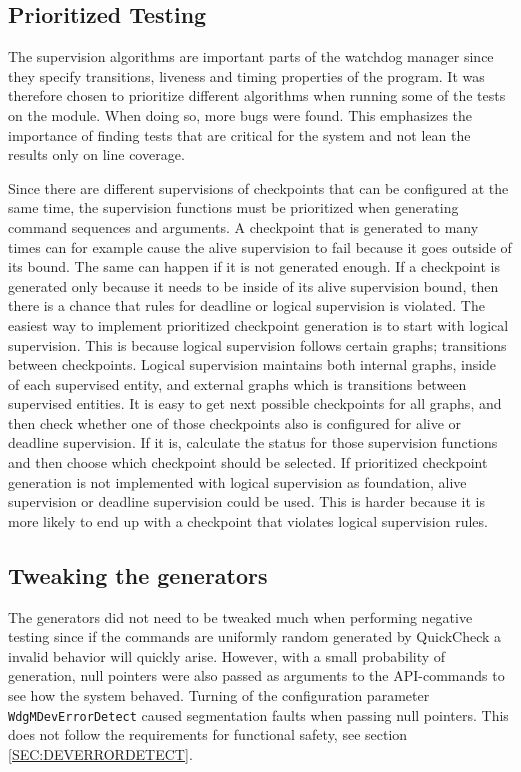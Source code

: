 \subsection{Prioritized Testing}
The supervision algorithms are important parts of the watchdog manager
since they specify transitions, liveness and timing properties of the
program. It was therefore chosen to prioritize different algorithms
when running some of the tests on the module. When doing so, more bugs
were found. This emphasizes the importance of finding tests that are
critical for the system and not lean the results only on line
coverage.

Since there are different supervisions of checkpoints that can be
configured at the same time, the supervision functions must be
prioritized when generating command sequences and arguments. A
checkpoint that is generated to many times can for example cause the
alive supervision to fail because it goes outside of its bound. The
same can happen if it is not generated enough. If a checkpoint is
generated only because it needs to be inside of its alive supervision
bound, then there is a chance that rules for deadline or logical
supervision is violated. The easiest way to implement prioritized
checkpoint generation is to start with logical supervision. This is
because logical supervision follows certain graphs; transitions
between checkpoints. Logical supervision maintains both internal
graphs, inside of each supervised entity, and external graphs which is
transitions between supervised entities. It is easy to get next
possible checkpoints for all graphs, and then check whether one of
those checkpoints also is configured for alive or deadline
supervision. If it is, calculate the status for those supervision
functions and then choose which checkpoint should be selected.
If prioritized checkpoint generation is not implemented with logical
supervision as foundation, alive supervision or deadline supervision
could be used. This is harder because it is more likely to end up with
a checkpoint that violates logical supervision rules.

\subsection{Tweaking the generators}
The generators did not need to be tweaked much when performing
negative testing since if the commands are uniformly random generated
by QuickCheck a invalid behavior will quickly arise. However, with a
small probability of generation, null pointers were also passed as
arguments to the API-commands to see how the system behaved. Turning
of the configuration parameter \lstinline!WdgMDevErrorDetect! caused
segmentation faults when passing null pointers. This does not follow
the requirements for functional safety, see section
\ref{SEC:DEVERRORDETECT}.

